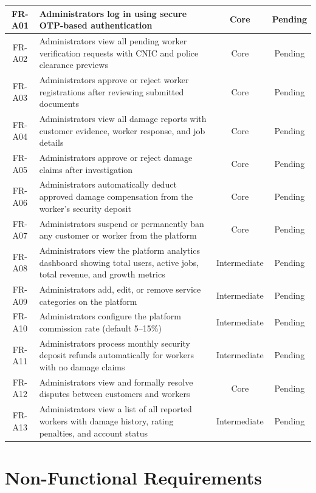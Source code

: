 \documentclass[12pt,a4paper]{report}
\begin{document}
\begin{longtable}{|c|p{9.5cm}|c|c|}
\hline
FR-A01 & Administrators log in using secure OTP-based authentication & Core & Pending \\
\hline
FR-A02 & Administrators view all pending worker verification requests with CNIC and police clearance previews & Core & Pending \\
\hline
FR-A03 & Administrators approve or reject worker registrations after reviewing submitted documents & Core & Pending \\
\hline
FR-A04 & Administrators view all damage reports with customer evidence, worker response, and job details & Core & Pending \\
\hline
FR-A05 & Administrators approve or reject damage claims after investigation & Core & Pending \\
\hline
FR-A06 & Administrators automatically deduct approved damage compensation from the worker's security deposit & Core & Pending \\
\hline
FR-A07 & Administrators suspend or permanently ban any customer or worker from the platform & Core & Pending \\
\hline
FR-A08 & Administrators view the platform analytics dashboard showing total users, active jobs, total revenue, and growth metrics & Intermediate & Pending \\
\hline
FR-A09 & Administrators add, edit, or remove service categories on the platform & Intermediate & Pending \\
\hline
FR-A10 & Administrators configure the platform commission rate (default 5--15\%) & Intermediate & Pending \\
\hline
FR-A11 & Administrators process monthly security deposit refunds automatically for workers with no damage claims & Intermediate & Pending \\
\hline
FR-A12 & Administrators view and formally resolve disputes between customers and workers & Core & Pending \\
\hline
FR-A13 & Administrators view a list of all reported workers with damage history, rating penalties, and account status & Intermediate & Pending \\
\hline
\end{longtable}

\section{Non-Functional Requirements}
\end{document}
